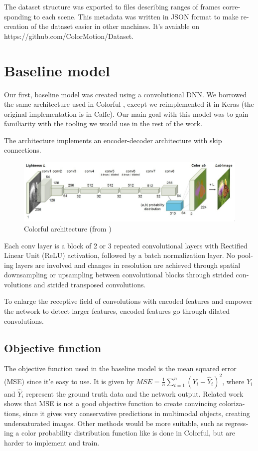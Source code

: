 \documentclass[12pt,openright,twoside,a4paper,english]{abntex2}
\begin{document}
\begin{otherlanguage}{english}
The dataset structure was exported to files describing ranges of frames corresponding to each scene. This metadata was written in JSON format to make re-creation of the dataset easier in other machines. It's avaiable on https://github.com/ColorMotion/Dataset.  %

\section{Baseline model}

Our first, baseline model was created using a convolutional DNN. We borrowed the same architecture used in Colorful \cite{colorful}, except we reimplemented it in Keras (the original implementation is in Caffe). Our main goal with this model was to gain familiarity with the tooling we would use in the rest of the work.

The architecture implements an encoder-decoder architecture with skip connections.

\begin{figure}[!htb]
\centering
\includegraphics[width=\textwidth]{Colorful}
\caption{Colorful architecture (from \cite{colorful})}
\label{colorful_architecture_paper}
\end{figure}

Each conv layer is a block of 2 or 3 repeated convolutional layers with Rectified Linear Unit (ReLU) activation, followed by a batch normalization layer. No pooling layers are involved and changes in resolution are achieved through spatial downsampling or upsampling between convolutional blocks through strided convolutions and strided transposed convolutions.

To enlarge the receptive field of convolutions with encoded features and empower the network to detect larger features, encoded features go through dilated convolutions.

\subsection{Objective function}

The objective function used in the baseline model is the mean squared error (MSE) since it'e easy to use. It is given by $MSE = \frac{1}{n}\sum_{t=1}^{n}(Y_i - \hat{Y}_i)^2$, where $Y_i$ and $\hat{Y}_i$ represent the ground truth data and the network output. Related work \cite{colorful} shows that MSE is not a good objective function to create convincing colorizations, since it gives very conservative predictions in multimodal objects, creating undersaturated images. Other methods would be more suitable, such as regressing a color probability distribution function like is done in Colorful, but are harder to implement and train.


\end{otherlanguage}
\end{document}
